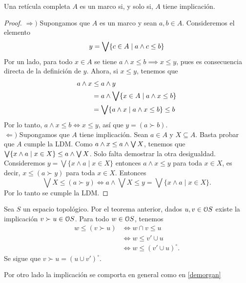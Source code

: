 \begin{theorem}
  Una retícula completa $A$ es un marco si, y solo si, $A$ tiene
  implicación.
\end{theorem}
\begin{proof}
    $\Rightarrow )$ Supongamos que $A$ es un marco y sean $a,b\in A$.
    Consideremos el elemento
    $$y=\Sup\{c\in A\mid a\wedge c\leq b\}$$
    Por un lado, para todo $x\in A$ se tiene
    $a\wedge x\leq b\implies x\leq y$,
    pues es consecuencia directa de la definición de $y$.
    Ahora, si $x\leq y$, tenemos que 
    \begin{align*}
        a\inf x
        & \leq a\inf y \\
        & = a\inf\Sup\{x\in A\mid a\inf x\leq b\}\\
        & = \Sup \{a\inf x \mid a\inf x\leq b\}\leq b
    \end{align*}
    Por lo tanto, $a\wedge x\leq b\Leftrightarrow x\leq y$,
    así que $y=(a\succ b)$. \\
    $\Leftarrow )$ Supongamos que $A$ tiene implicación.
    Sean $a\in A$ y $X\subseteq A$.
    Basta probar que $A$ cumple la LDM.
    Como $a\inf x\leq a\inf\Sup X$, tenemos que
    $\Sup\{x\inf a\mid x\in X\}\leq a\inf\Sup X$.
    Solo falta demostrar la otra desigualdad. Consideremos $y=\bigvee\{x\wedge a\mid x\in X\}$
    entonces $a\wedge x\leq y$ para toda $x\in X$, es decir, $x\leq (a\succ y)$ para toda $x\in X$. 
    Entonces \[\bigvee X\leq (a\succ y)\Leftrightarrow a\wedge\bigvee X\leq y=\bigvee \{x\wedge a\mid x\in X\}.\] 
    Por lo tanto se cumple la LDM.
\end{proof}



\begin{example}
  Sea $S$ un espacio topológico.
  Por el teorema anterior, dados $u,v\in\cal OS$
  existe la implicación $v\succ u\in \cal OS$.
  Para todo $w\in\cal OS$, tenemos
  \begin{align*}
    w\leq (v\succ u)
    &\iff w\cap v\leq u \\
    &\iff w\leq v'\cup u \\
    &\iff w\leq (v'\cup u)^\circ.
  \end{align*}
  Se sigue que $v\succ u = (u\cup v')^\circ$.
\end{example}

Por otro lado la implicación se comporta en general como en \ref{demorgan}

